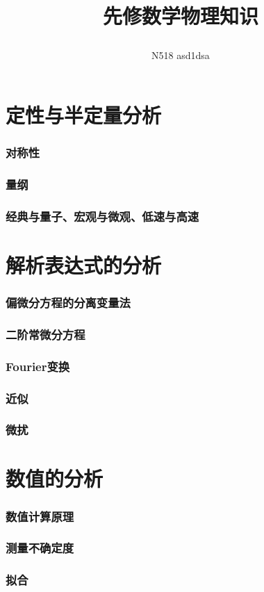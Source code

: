 \documentclass[10pt]{article}
\title{
	\begin{center}
		{\Huge 先修数学物理知识}%
	\end{center}
}
\author{N518 asd1dsa}
\affiliation{
哈尔滨工业大学（威海）\\
理学院
}
\begin{document}
	\maketitle
	\flushbottom
	\newpage
	\pagestyle{fancynotes}
	\part{定性与半定量分析}
		\section{对称性}
		\section{量纲}
		\section{经典与量子、宏观与微观、低速与高速}

	\part{解析表达式的分析}
		\section{偏微分方程的分离变量法}
		\section{二阶常微分方程}
		\section{Fourier变换}
		\section{近似}
		\section{微扰}

	\part{数值的分析}
		\section{数值计算原理}
		\section{测量不确定度}
		\section{拟合}
\end{document}
